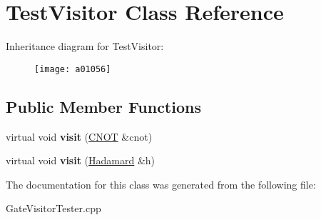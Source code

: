 \hypertarget{a01056}{}\section{Test\+Visitor Class Reference}
\label{a01056}
Inheritance diagram for Test\+Visitor\+:\begin{figure}[H]
\begin{center}
\leavevmode
\texttt{[image: a01056]}
\end{center}
\end{figure}
\subsection*{Public Member Functions}
\begin{DoxyCompactItemize}
\item 
\mbox{\label{a01056_a2766c0664632ae33300eb9e663a26005}} 
virtual void {\bfseries visit} (\hyperlink{a01008}{C\+N\+OT} \&cnot)
\item 
\mbox{\label{a01056_a0a0f77d3f19f9bda449318a52031f2d4}} 
virtual void {\bfseries visit} (\hyperlink{a01020}{Hadamard} \&h)
\end{DoxyCompactItemize}


The documentation for this class was generated from the following file\+:\begin{DoxyCompactItemize}
\item 
Gate\+Visitor\+Tester.\+cpp\end{DoxyCompactItemize}

